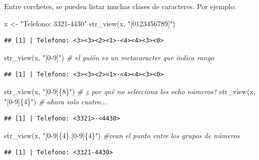 \documentclass[
]{book}
\newenvironment{Shaded}{\begin{snugshade}}{\end{snugshade}}
\newcommand{\CommentTok}[1]{\textcolor[rgb]{0.56,0.35,0.01}{\textit{#1}}}
\newcommand{\FunctionTok}[1]{\textcolor[rgb]{0.00,0.00,0.00}{#1}}
\newcommand{\NormalTok}[1]{#1}
\newcommand{\OtherTok}[1]{\textcolor[rgb]{0.56,0.35,0.01}{#1}}
\newcommand{\StringTok}[1]{\textcolor[rgb]{0.31,0.60,0.02}{#1}}
\begin{document}
Entre corchetes, se pueden listar muchas clases de caracteres. Por ejemplo:

\begin{Shaded}
\begin{Highlighting}[]
\NormalTok{x }\OtherTok{\textless{}{-}} \StringTok{"Telefono: 3321{-}4430"}
\FunctionTok{str\_view}\NormalTok{(x, }\StringTok{"[0123456789]"}\NormalTok{)}
\end{Highlighting}
\end{Shaded}

\begin{verbatim}
## [1] | Telefono: <3><3><2><1>-<4><4><3><0>
\end{verbatim}

\begin{Shaded}
\begin{Highlighting}[]
\FunctionTok{str\_view}\NormalTok{(x, }\StringTok{"[0{-}9]"}\NormalTok{) }\CommentTok{\# el guión es un metacaracter que indica rango}
\end{Highlighting}
\end{Shaded}

\begin{verbatim}
## [1] | Telefono: <3><3><2><1>-<4><4><3><0>
\end{verbatim}

\begin{Shaded}
\begin{Highlighting}[]
\FunctionTok{str\_view}\NormalTok{(x, }\StringTok{"[0{-}9]\{8\}"}\NormalTok{) }\CommentTok{\# ¿ por qué no selecciona los ocho números?}
\FunctionTok{str\_view}\NormalTok{(x, }\StringTok{"[0{-}9]\{4\}"}\NormalTok{) }\CommentTok{\# ahora solo cuatro...}
\end{Highlighting}
\end{Shaded}

\begin{verbatim}
## [1] | Telefono: <3321>-<4430>
\end{verbatim}

\begin{Shaded}
\begin{Highlighting}[]
\FunctionTok{str\_view}\NormalTok{(x, }\StringTok{"[0{-}9]\{4\}.[0{-}9]\{4\}"}\NormalTok{) }\CommentTok{\#vean el punto entre los grupos de números}
\end{Highlighting}
\end{Shaded}

\begin{verbatim}
## [1] | Telefono: <3321-4430>
\end{verbatim}
\end{document}
